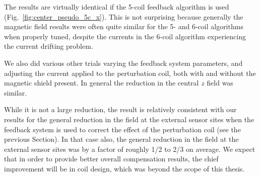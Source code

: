 
The results are virtually identical if the 5-coil feedback algorithm
is used (Fig.~\ref{fig:center_pseudo_5c_x}).  This is not surprising
because generally the magnetic field results were often quite similar
for the 5- and 6-coil algorithms when properly tuned, despite the
currents in the 6-coil algorithm experiencing the current drifting
problem.




We also did various other trials varying the feedback system
parameters, and adjusting the current applied to the perturbation
coil, both with and without the magnetic shield present.  In general
the reduction in the central $z$ field was similar.

While it is not a large reduction, the result is relatively consistent
with our results for the general reduction in the field at the external
sensor sites when the feedback system is used to correct the effect of
the perturbation coil (see the previous Section).  In that case also,
the general reduction in the field at the external sensor sites was by a factor of roughly 1/2 to 2/3 on average.  We expect that in
order to provide better overall compensation results, the chief
improvement will be in coil design, which was beyond the scope of this
thesis.




